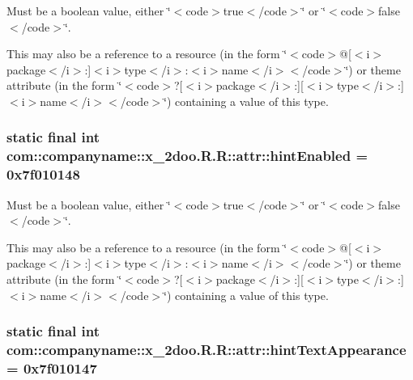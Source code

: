 Must be a boolean value, either \char`\"{}$<$code$>$true$<$/code$>$\char`\"{} or \char`\"{}$<$code$>$false$<$/code$>$\char`\"{}. 

This may also be a reference to a resource (in the form \char`\"{}$<$code$>$@\mbox{[}$<$i$>$package$<$/i$>$:\mbox{]}$<$i$>$type$<$/i$>$:$<$i$>$name$<$/i$>$$<$/code$>$\char`\"{}) or theme attribute (in the form \char`\"{}$<$code$>$?\mbox{[}$<$i$>$package$<$/i$>$:\mbox{]}\mbox{[}$<$i$>$type$<$/i$>$:\mbox{]}$<$i$>$name$<$/i$>$$<$/code$>$\char`\"{}) containing a value of this type. \hypertarget{classcom_1_1companyname_1_1x__2doo_1_1_r_1_1attr_001f6d005ae626a560ad1a3aa557b316}{
\subsubsection[{hintEnabled}]{\setlength{\rightskip}{0pt plus 5cm}static final int com::companyname::x\_\-2doo.R.R::attr::hintEnabled = 0x7f010148}}
\label{classcom_1_1companyname_1_1x__2doo_1_1_r_1_1attr_001f6d005ae626a560ad1a3aa557b316}


Must be a boolean value, either \char`\"{}$<$code$>$true$<$/code$>$\char`\"{} or \char`\"{}$<$code$>$false$<$/code$>$\char`\"{}. 

This may also be a reference to a resource (in the form \char`\"{}$<$code$>$@\mbox{[}$<$i$>$package$<$/i$>$:\mbox{]}$<$i$>$type$<$/i$>$:$<$i$>$name$<$/i$>$$<$/code$>$\char`\"{}) or theme attribute (in the form \char`\"{}$<$code$>$?\mbox{[}$<$i$>$package$<$/i$>$:\mbox{]}\mbox{[}$<$i$>$type$<$/i$>$:\mbox{]}$<$i$>$name$<$/i$>$$<$/code$>$\char`\"{}) containing a value of this type. \hypertarget{classcom_1_1companyname_1_1x__2doo_1_1_r_1_1attr_c38cc4dc2f8439053a813eb5b6c09bed}{
\subsubsection[{hintTextAppearance}]{\setlength{\rightskip}{0pt plus 5cm}static final int com::companyname::x\_\-2doo.R.R::attr::hintTextAppearance = 0x7f010147}}
\label{classcom_1_1companyname_1_1x__2doo_1_1_r_1_1attr_c38cc4dc2f8439053a813eb5b6c09bed}


